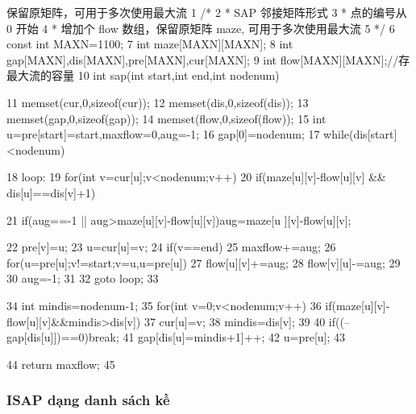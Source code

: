 \documentclass[11pt]{article}
\begin{document}
\begin{Code}
     保留原矩阵，可用于多次使用最大流
 1   /*
 2    * SAP 邻接矩阵形式
 3    * 点的编号从 0 开始
 4    * 增加个 flow 数组，保留原矩阵 maze, 可用于多次使用最大流
 5    */
 6   const int MAXN=1100;
 7   int maze[MAXN][MAXN];
 8   int gap[MAXN],dis[MAXN],pre[MAXN],cur[MAXN];
 9   int flow[MAXN][MAXN];//存最大流的容量
10   int sap(int start,int end,int nodenum){
11       memset(cur,0,sizeof(cur));
12       memset(dis,0,sizeof(dis));
13       memset(gap,0,sizeof(gap));
14       memset(flow,0,sizeof(flow));
15       int u=pre[start]=start,maxflow=0,aug=-1;
16       gap[0]=nodenum;
17       while(dis[start]<nodenum){
18           loop:
19             for(int v=cur[u];v<nodenum;v++)
20               if(maze[u][v]-flow[u][v] && dis[u]==dis[v]+1){
21                   if(aug==-1 || aug>maze[u][v]-flow[u][v])aug=maze[u
                        ][v]-flow[u][v];


22                   pre[v]=u;
23                   u=cur[u]=v;
24                   if(v==end){
25                       maxflow+=aug;
26                       for(u=pre[u];v!=start;v=u,u=pre[u]){
27                           flow[u][v]+=aug;
28                           flow[v][u]-=aug;
29                       }
30                       aug=-1;
31                   }
32                   goto loop;
33               }
34               int mindis=nodenum-1;
35               for(int v=0;v<nodenum;v++)
36                  if(maze[u][v]-flow[u][v]&&mindis>dis[v]){
37                      cur[u]=v;
38                      mindis=dis[v];
39                  }
40               if((--gap[dis[u]])==0)break;
41               gap[dis[u]=mindis+1]++;
42               u=pre[u];
43       }
44       return maxflow;
45 }
\end{Code}

\subsubsection{ISAP dạng danh sách kề}
\end{document}
